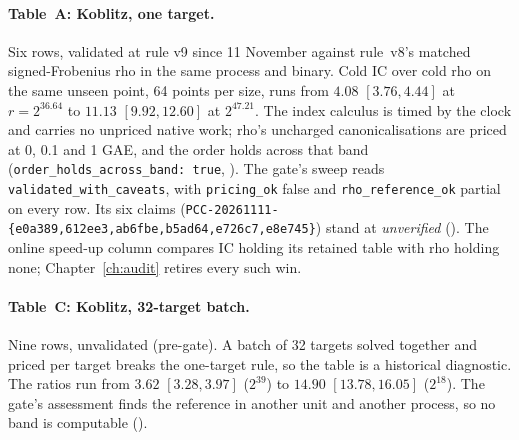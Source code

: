 \paragraph{Table~A: Koblitz, one target.} Six rows, validated at rule
v9 since 11 November against rule~v8's matched signed-Frobenius rho in the
same process and binary. Cold IC over cold rho on the same unseen point,
64 points per size, runs from $4.08$ $[3.76,4.44]$ at $r=2^{36.64}$ to
$11.13$ $[9.92,12.60]$ at $2^{47.21}$. The index calculus is timed by the
clock and carries no unpriced native work; rho's uncharged
canonicalisations are priced at 0, 0.1 and 1 GAE, and the order holds
across that band (\texttt{order\_holds\_across\_band: true},
). The gate's sweep
reads \texttt{validated\_with\_caveats}, with \texttt{pricing\_ok} false and
\texttt{rho\_reference\_ok} partial on every row. Its six claims
(\texttt{PCC-20261111-\{e0a389,612ee3,ab6fbe,b5ad64,e726c7,e8e745\}}) stand
at \emph{unverified}
(). The online
speed-up column compares IC holding its retained table with rho holding
none; Chapter~\ref{ch:audit} retires every such win.

\begin{table}[t]
\centering\small
\setlength{\tabcolsep}{3.5pt}

\caption[]{Leaderboard Table~A, all six rows, validated with caveats
(rule v9). $S$ in batched-addition units per $\sqrt r$, each process
measuring its own unit. IC/$\rho$, v7: the before mark, rule v7 with rho
as it then was. Online speed-up: rho's walk over IC's online phase, 64
targets. Break-even: targets after which IC's set-up is repaid against
rho. Canon.\ step: rho's canonical batched step in units. Sources:
 at \texttt{bb70178877};
. Data:
.}
\label{tab:fr-boardA}
\end{table}

\paragraph{Table~C: Koblitz, 32-target batch.} Nine rows, unvalidated
(pre-gate). A batch of 32 targets solved together and priced per target
breaks the one-target rule, so the table is a historical diagnostic. The
ratios run from $3.62$ $[3.28,3.97]$ ($2^{39}$) to $14.90$ $[13.78,16.05]$
($2^{18}$). The gate's assessment finds the reference in another unit and
another process, so no band is computable
().

